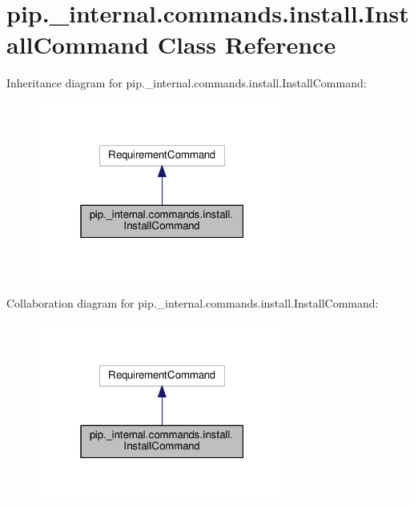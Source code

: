 \hypertarget{classpip_1_1__internal_1_1commands_1_1install_1_1InstallCommand}{}\section{pip.\+\_\+internal.\+commands.\+install.\+Install\+Command Class Reference}
\label{classpip_1_1__internal_1_1commands_1_1install_1_1InstallCommand}


Inheritance diagram for pip.\+\_\+internal.\+commands.\+install.\+Install\+Command\+:
\nopagebreak
\begin{figure}[H]
\begin{center}
\leavevmode
\includegraphics[width=232pt]{classpip_1_1__internal_1_1commands_1_1install_1_1InstallCommand__inherit__graph}
\end{center}
\end{figure}


Collaboration diagram for pip.\+\_\+internal.\+commands.\+install.\+Install\+Command\+:
\nopagebreak
\begin{figure}[H]
\begin{center}
\leavevmode
\includegraphics[width=232pt]{classpip_1_1__internal_1_1commands_1_1install_1_1InstallCommand__coll__graph}
\end{center}
\end{figure}
